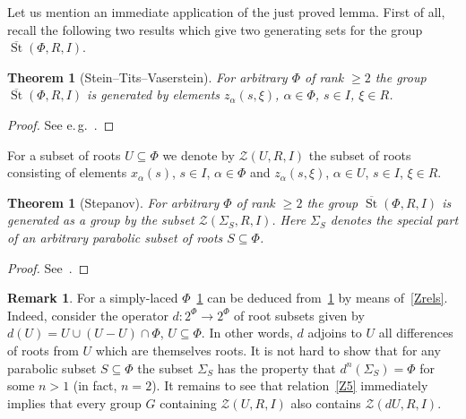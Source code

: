 \documentclass[oneside, 8pt]{amsart}
\newtheorem{externaltheorem}[lemma]{Theorem}
\theoremstyle{remark}
\theoremstyle{definition}
\numberwithin{lemma}{section}
\numberwithin{prop}{section}
\numberwithin{corollary}{section}
\numberwithin{externaltheorem}{section}
\newtheorem{rem}[lemma]{Remark}
\DeclareMathOperator{\St}{St}
\numberwithin{equation}{section}
\begin{document}
Let us mention an immediate application of the just proved lemma. 
First of all, recall the following two results which give two generating sets for the group $\overline{\St}(\Phi, R, I)$.
\begin{externaltheorem}[Stein--Tits--Vaserstein] \label{thm:Tits} For arbitrary $\Phi$ of rank $\geq 2$ the group $\overline{\St}(\Phi, R, I)$ is generated by elements $z_\alpha(s, \xi)$, $\alpha \in \Phi$, $s \in I$, $\xi \in R$. \end{externaltheorem} \begin{proof} See e.\,g.~\cite[Theorem 2]{Va86}. \end{proof}

For a subset of roots $U \subseteq \Phi$ we denote by $\mathcal{Z}(U, R, I)$ the subset of roots consisting of elements $x_\alpha(s)$, $s \in I$, $\alpha \in \Phi$ and $z_\alpha(s, \xi)$, $\alpha \in U$, $s\in I$, $\xi \in R$.

\begin{externaltheorem}[Stepanov] \label{thm:Stepanov} For arbitrary $\Phi$ of rank $\geq 2$ the group $\overline{\St}(\Phi, R, I)$ is generated as a group by the subset $\mathcal{Z}(\Sigma_S, R, I)$.
 Here $\Sigma_S$ denotes the special part of an arbitrary parabolic subset of roots $S \subseteq \Phi$.
\end{externaltheorem} \begin{proof} See~\cite[Lemma~4]{S15}. \end{proof}

\begin{rem} For a simply-laced $\Phi$~\cref{thm:Stepanov} can be deduced from~\cref{thm:Tits} by means of~\cref{Zrels}. Indeed, consider the operator $d \colon 2^\Phi \to 2^\Phi$ of root subsets given by $d(U) = U \cup (U - U)\cap \Phi$, $U \subseteq \Phi$. In other words, $d$ adjoins to $U$ all differences of roots from $U$ which are themselves roots. It is not hard to show that for any parabolic subset $S \subseteq \Phi$ the subset $\Sigma_S$ has the property that $d^n(\Sigma_S) = \Phi$ for some $n>1$ (in fact, $n=2$). It remains to see that relation~\eqref{Z5} immediately implies that every group $G$ containing $\mathcal{Z}(U, R, I)$ also contains $\mathcal{Z}(dU, R, I)$. \end{rem}
\end{document}
